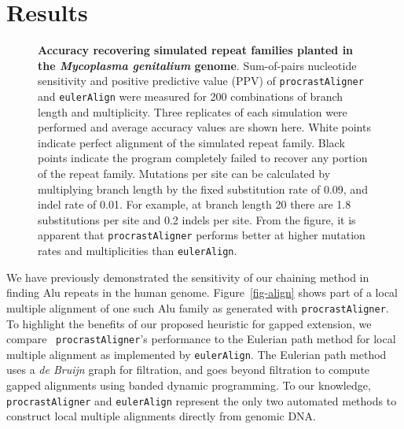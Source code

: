 \documentclass{llncs}
\begin{document}
\section{Results}
\begin{figure}[t]
\centering {}
\caption{\textbf{Accuracy recovering simulated repeat families planted in the
\textit{Mycoplasma genitalium} genome}.  \scriptsize Sum-of-pairs nucleotide
sensitivity and positive predictive value (PPV) of \texttt{procrastAligner} and \texttt{eulerAlign} were measured for 200
combinations of branch length and multiplicity.  Three replicates of
each simulation were performed and average accuracy values are shown
here.  White points indicate perfect alignment of the simulated repeat
family.  Black points indicate the program completely failed to
recover any portion of the repeat family.  Mutations per site can be
calculated by multiplying branch length by the fixed substitution rate
of 0.09, and indel rate of 0.01.  For example, at branch length 20
there are 1.8 substitutions per site and 0.2 indels per site.  From
the figure, it is apparent that \texttt{procrastAligner} performs better
at higher mutation rates and multiplicities than \texttt{eulerAlign}.}
\label{fig-results}\vspace{-0.2cm}
\end{figure}

We have previously demonstrated the sensitivity of our chaining method
in finding Alu repeats in the human
genome\cite{ref-procrast}. Figure~\ref{fig-align} shows part of a
local multiple alignment of one such Alu family as generated with
\texttt{procrastAligner}. To highlight the benefits of our proposed
heuristic for gapped extension, we compare ~\texttt{procrastAligner}'s
performance to the Eulerian path method for local multiple alignment
as implemented by \texttt{eulerAlign}\cite{ref-related1}. The Eulerian
path method uses a \textit{de Bruijn} graph for filtration, and goes
beyond filtration to compute gapped alignments using banded dynamic
programming.  To our knowledge, \texttt{procrastAligner} and
\texttt{eulerAlign} represent the only two automated methods to
construct local multiple alignments directly from genomic DNA.
\end{document}
